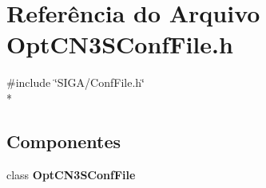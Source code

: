\section{Referência do Arquivo Opt\+C\+N3\+S\+Conf\+File.\+h}
\label{_opt_c_n3_s_conf_file_8h}
{\ttfamily \#include \char`\"{}S\+I\+G\+A/\+Conf\+File.\+h\char`\"{}}\\*
\subsection*{Componentes}
\begin{DoxyCompactItemize}
\item 
class {\bf Opt\+C\+N3\+S\+Conf\+File}
\end{DoxyCompactItemize}
